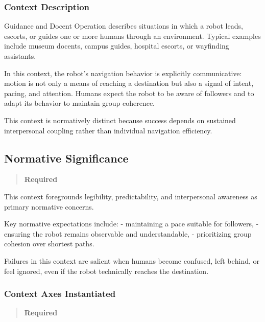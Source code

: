 \documentclass[utf8]{frontiers_suppmat} %
\begin{document}
\subsubsection{Context Description}\label{context-description}

Guidance and Docent Operation describes situations in which a robot
leads, escorts, or guides one or more humans through an environment.
Typical examples include museum docents, campus guides, hospital
escorts, or wayfinding assistants.

In this context, the robot's navigation behavior is explicitly
communicative: motion is not only a means of reaching a destination but
also a signal of intent, pacing, and attention. Humans expect the robot
to be aware of followers and to adapt its behavior to maintain group
coherence.

This context is normatively distinct because success depends on
sustained interpersonal coupling rather than individual navigation
efficiency.


\subsection{Normative Significance}\label{normative-significance}

\begin{quote}
\textbf{Required}
\end{quote}

This context foregrounds legibility, predictability, and interpersonal
awareness as primary normative concerns.

Key normative expectations include: - maintaining a pace suitable for
followers, - ensuring the robot remains observable and understandable, -
prioritizing group cohesion over shortest paths.

Failures in this context are salient when humans become confused, left
behind, or feel ignored, even if the robot technically reaches the
destination.


\subsubsection{Context Axes Instantiated}\label{context-axes-instantiated}

\begin{quote}
\textbf{Required}
\end{quote}

\label{cultural-context}
\end{document}
